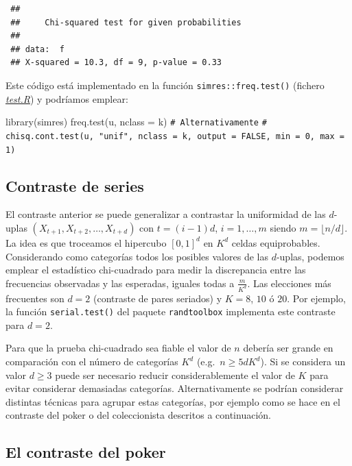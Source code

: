 \documentclass[
  10pt,
]{book}
\newenvironment{Shaded}{\begin{snugshade}}{\end{snugshade}}
\newcommand{\AttributeTok}[1]{\textcolor[rgb]{0.77,0.63,0.00}{#1}}
\newcommand{\CommentTok}[1]{\textcolor[rgb]{0.56,0.35,0.01}{\textit{#1}}}
\newcommand{\FunctionTok}[1]{\textcolor[rgb]{0.00,0.00,0.00}{#1}}
\newcommand{\NormalTok}[1]{#1}
\theoremstyle{break}
\theoremstyle{nonumberplain}
\renewcommand{\CommentTok}[1]{\textcolor[rgb]{0.41,0.41,0.41}{\texttt{#1}}}
\begin{document}
\begin{verbatim}
 ## 
 ##     Chi-squared test for given probabilities
 ## 
 ## data:  f
 ## X-squared = 10.3, df = 9, p-value = 0.33
\end{verbatim}

Este código está implementado en la función \texttt{simres::freq.test()} (fichero \href{R/test.R}{\emph{test.R}}) y podríamos emplear:

\begin{Shaded}
\begin{Highlighting}[]
\FunctionTok{library}\NormalTok{(simres)}
\FunctionTok{freq.test}\NormalTok{(u, }\AttributeTok{nclass =}\NormalTok{ k)}
\CommentTok{\# Alternativamente}
\CommentTok{\# chisq.cont.test(u, "unif", nclass = k, output = FALSE, min = 0, max = 1)}
\end{Highlighting}
\end{Shaded}

\hypertarget{contraste-de-series}{%
\subsection{Contraste de series}\label{contraste-de-series}}

El contraste anterior se puede generalizar a contrastar la uniformidad de las \(d\)-uplas \((X_{t+1},X_{t+2},\ldots,X_{t+d})\) con \(t=(i-1)d\), \(i=1,\ldots,m\) siendo \(m=\lfloor n/d \rfloor\).
La idea es que troceamos el hipercubo \([0, 1]^d\) en \(K^d\) celdas equiprobables.
Considerando como categorías todos los posibles valores de las \(d\)-uplas, podemos emplear el estadístico chi-cuadrado para medir la discrepancia entre las frecuencias observadas y las esperadas, iguales todas a \(\frac{m}{K^d}\).
Las elecciones más frecuentes son \(d=2\) (contraste de pares seriados) y \(K=8\), \(10\) ó \(20\).
Por ejemplo, la función \texttt{serial.test()} del paquete \texttt{randtoolbox} implementa este contraste para \(d=2\).

Para que la prueba chi-cuadrado sea fiable el valor de \(n\) debería ser grande en comparación con el número de categorías \(K^d\) (e.g.~\(n \geq 5dK^d\)).
Si se considera un valor \(d \geq 3\) puede ser necesario reducir considerablemente el valor de \(K\) para evitar considerar demasiadas categorías.
Alternativamente se podrían considerar distintas técnicas para agrupar estas categorías, por ejemplo como se hace en el contraste del poker o del coleccionista descritos a continuación.

\hypertarget{el-contraste-del-poker}{%
\subsection{El contraste del poker}\label{el-contraste-del-poker}}
\end{document}

